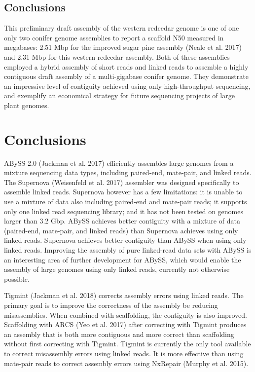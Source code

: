 \documentclass[
  12pt,
  oneside,
  openany]{book}
\begin{document}
\hypertarget{conclusions-5}{%
\section{Conclusions}\label{conclusions-5}}

This preliminary draft assembly of the western redcedar genome is one of one only two conifer genome assemblies to report a scaffold N50 measured in megabases: 2.51 Mbp for the improved sugar pine assembly (Neale et al. 2017) and 2.31 Mbp for this western redcedar assembly. Both of these assemblies employed a hybrid assembly of short reads and linked reads to assemble a highly contiguous draft assembly of a multi-gigabase conifer genome. They demonstrate an impressive level of contiguity achieved using only high-throughput sequencing, and exemplify an economical strategy for future sequencing projects of large plant genomes.

\hypertarget{conclusions-6}{%
\chapter{Conclusions}\label{conclusions-6}}

ABySS 2.0 (Jackman et al. 2017) efficiently assembles large genomes from a mixture sequencing data types, including paired-end, mate-pair, and linked reads. The Supernova (Weisenfeld et al. 2017) assembler was designed specifically to assemble linked reads. Supernova however has a few limitations: it is unable to use a mixture of data also including paired-end and mate-pair reads; it supports only one linked read sequencing library; and it has not been tested on genomes larger than 3.2 Gbp. ABySS achieves better contiguity with a mixture of data (paired-end, mate-pair, and linked reads) than Supernova achieves using only linked reads. Supernova achieves better contiguity than ABySS when using only linked reads. Improving the assembly of pure linked-read data sets with ABySS is an interesting area of further development for ABySS, which would enable the assembly of large genomes using only linked reads, currently not otherwise possible.

Tigmint (Jackman et al. 2018) corrects assembly errors using linked reads. The primary goal is to improve the correctness of the assembly be reducing misassemblies. When combined with scaffolding, the contiguity is also improved. Scaffolding with ARCS (Yeo et al. 2017) after correcting with Tigmint produces an assembly that is both more contiguous and more correct than scaffolding without first correcting with Tigmint. Tigmint is currently the only tool available to correct misassembly errors using linked reads. It is more effective than using mate-pair reads to correct assembly errors using NxRepair (Murphy et al. 2015).
\end{document}
